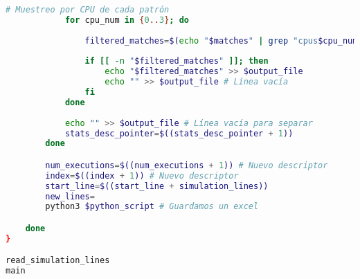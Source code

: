 \begin{lstlisting}[language=bash,caption={Programa de filtrado de estadísticas de Gem5},label=lst:getStats, showstringspaces=false,frame=single]
            # Muestreo por CPU de cada patrón
            for cpu_num in {0..3}; do
                
                filtered_matches=$(echo "$matches" | grep "cpus$cpu_num")
            
                if [[ -n "$filtered_matches" ]]; then 
                    echo "$filtered_matches" >> $output_file
                    echo "" >> $output_file # Línea vacía
                fi
            done
            
            echo "" >> $output_file # Línea vacía para separar
            stats_desc_pointer=$((stats_desc_pointer + 1))
        done

        num_executions=$((num_executions + 1)) # Nuevo descriptor
        index=$((index + 1)) # Nuevo descriptor
        start_line=$((start_line + simulation_lines))
        new_lines=
        python3 $python_script # Guardamos un excel

    done
}

read_simulation_lines
main
\end{lstlisting}

